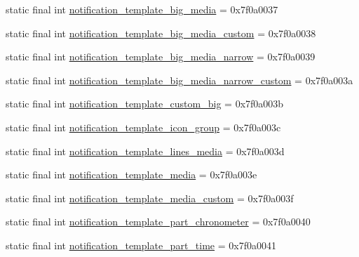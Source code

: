\begin{DoxyCompactItemize}
\item 
static final int \mbox{\hyperlink{classandroid_1_1support_1_1design_1_1_r_1_1layout_a937801124bdcdd939ce59fe3913a9762}{notification\+\_\+template\+\_\+big\+\_\+media}} = 0x7f0a0037
\item 
static final int \mbox{\hyperlink{classandroid_1_1support_1_1design_1_1_r_1_1layout_ac48d0f30a65cf14a5d13026a68580c17}{notification\+\_\+template\+\_\+big\+\_\+media\+\_\+custom}} = 0x7f0a0038
\item 
static final int \mbox{\hyperlink{classandroid_1_1support_1_1design_1_1_r_1_1layout_a85e748195c9daddc8bb8fe726a1a5da2}{notification\+\_\+template\+\_\+big\+\_\+media\+\_\+narrow}} = 0x7f0a0039
\item 
static final int \mbox{\hyperlink{classandroid_1_1support_1_1design_1_1_r_1_1layout_ac5850f50d9b00b6d8bef8170ae46d560}{notification\+\_\+template\+\_\+big\+\_\+media\+\_\+narrow\+\_\+custom}} = 0x7f0a003a
\item 
static final int \mbox{\hyperlink{classandroid_1_1support_1_1design_1_1_r_1_1layout_a3f655a0c29e0f05b1530f853466714d2}{notification\+\_\+template\+\_\+custom\+\_\+big}} = 0x7f0a003b
\item 
static final int \mbox{\hyperlink{classandroid_1_1support_1_1design_1_1_r_1_1layout_af18dacccacfd30520ce9e95dffe3735c}{notification\+\_\+template\+\_\+icon\+\_\+group}} = 0x7f0a003c
\item 
static final int \mbox{\hyperlink{classandroid_1_1support_1_1design_1_1_r_1_1layout_aff5e95253f828cd42a503893c4e9dd6e}{notification\+\_\+template\+\_\+lines\+\_\+media}} = 0x7f0a003d
\item 
static final int \mbox{\hyperlink{classandroid_1_1support_1_1design_1_1_r_1_1layout_af6499fd4c261801e10b2e023556ceb2e}{notification\+\_\+template\+\_\+media}} = 0x7f0a003e
\item 
static final int \mbox{\hyperlink{classandroid_1_1support_1_1design_1_1_r_1_1layout_a73930b457283d5321064a22320c07cb4}{notification\+\_\+template\+\_\+media\+\_\+custom}} = 0x7f0a003f
\item 
static final int \mbox{\hyperlink{classandroid_1_1support_1_1design_1_1_r_1_1layout_adbf595dcbbe5468a640c75da765e94c5}{notification\+\_\+template\+\_\+part\+\_\+chronometer}} = 0x7f0a0040
\item 
static final int \mbox{\hyperlink{classandroid_1_1support_1_1design_1_1_r_1_1layout_a207f018f5184f266fb707b3c42dff303}{notification\+\_\+template\+\_\+part\+\_\+time}} = 0x7f0a0041
\item 

\end{DoxyCompactItemize}
